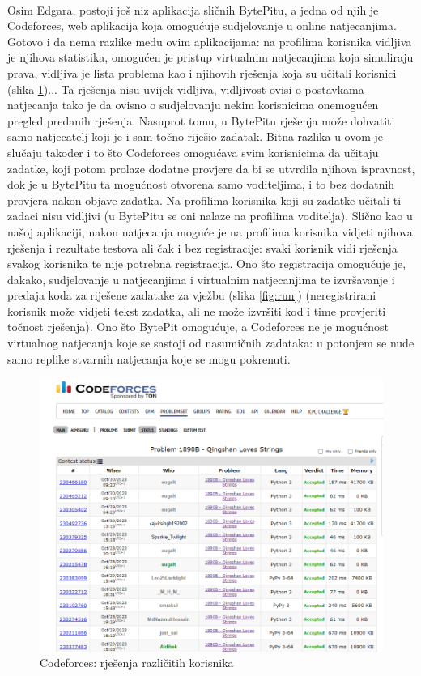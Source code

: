 		\noindent\\
			Osim Edgara, postoji još niz aplikacija sličnih BytePitu, a jedna od njih je Codeforces, web aplikacija koja omogućuje sudjelovanje u online natjecanjima. Gotovo i da nema razlike među ovim aplikacijama: na profilima korisnika vidljiva je njihova statistika, omogućen je pristup virtualnim natjecanjima koja simuliraju prava, vidljiva je lista problema kao i njihovih rješenja koja su učitali korisnici (slika \ref{fig:problemi})... Ta rješenja nisu uvijek vidljiva, vidljivost ovisi o postavkama natjecanja tako je da ovisno o sudjelovanju nekim korisnicima onemogućen pregled predanih rješenja. Nasuprot tomu, u BytePitu rješenja može dohvatiti samo natjecatelj koji je i sam točno riješio zadatak. Bitna razlika u ovom je slučaju također i to što Codeforces omogućava svim korisnicima da učitaju zadatke, koji potom prolaze dodatne provjere da bi se utvrdila njihova ispravnost, dok je u BytePitu ta mogućnost otvorena samo voditeljima, i to bez dodatnih provjera nakon objave zadatka. Na profilima korisnika koji su zadatke učitali ti zadaci nisu vidljivi (u BytePitu se oni nalaze na profilima voditelja).
		Slično kao u našoj aplikaciji, nakon natjecanja moguće je na profilima korisnika vidjeti njihova rješenja i rezultate testova ali čak i bez registracije: svaki korisnik vidi rješenja svakog korisnika te nije potrebna registracija. Ono što registracija omogućuje je, dakako, sudjelovanje u natjecanjima i virtualnim natjecanjima te izvršavanje i predaja koda za riješene zadatake za vježbu (slika \ref{fig:run}) (neregistrirani korisnik može vidjeti tekst zadatka, ali ne može izvršiti kod i time provjeriti točnost rješenja). Ono što BytePit omogućuje, a Codeforces ne je mogućnost virtualnog natjecanja koje se sastoji od nasumičnih zadataka: u potonjem se nude samo replike stvarnih natjecanja koje se mogu pokrenuti. \\
		
			\begin{figure}[H]
			\includegraphics[scale=0.4]{slike/cf1}
			\centering
			\caption{Codeforces: rješenja različitih korisnika}
			\label{fig:problemi}
		\end{figure}
		
